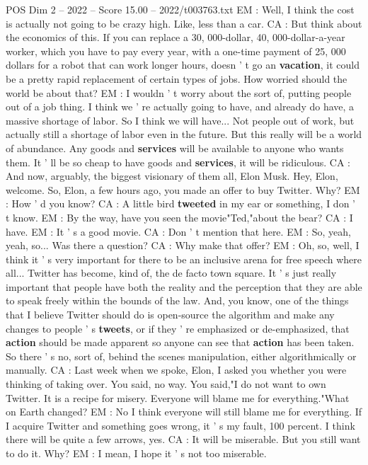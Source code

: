 \begin{textsample}{POS Dim 2 – 2022 – Score 15.00 – 2022/t003763.txt}
EM : Well, I think the cost is actually not going to be crazy high.
Like, less than a car.
CA : But think about the economics of this.
If you can replace a 30, 000-dollar, 40, 000-dollar-a-year worker, which you have to pay every year, with a one-time payment of 25, 000 dollars for a robot that can work longer hours, doesn ' t go an \textbf{vacation}, it could be a pretty rapid replacement of certain types of jobs.
How worried should the world be about that?
EM : I wouldn ' t worry about the sort of, putting people out of a job thing.
I think we ' re actually going to have, and already do have, a massive shortage of labor.
So I think we will have...
Not people out of work, but actually still a shortage of labor even in the future.
But this really will be a world of abundance.
Any goods and \textbf{services} will be available to anyone who wants them.
It ' ll be so cheap to have goods and \textbf{services}, it will be ridiculous.
CA : And now, arguably, the biggest visionary of them all, Elon Musk.
Hey, Elon, welcome.
So, Elon, a few hours ago, you made an offer to buy Twitter.
Why?
EM : How ' d you know?
CA : A little bird \textbf{tweeted} in my ear or something, I don ' t know.
EM : By the way, have you seen the movie"Ted,"about the bear?
CA : I have.
EM : It ' s a good movie.
CA : Don ' t mention that here.
EM : So, yeah, yeah, so...
Was there a question?
CA : Why make that offer?
EM : Oh, so, well, I think it ' s very important for there to be an inclusive arena for free speech where all...
Twitter has become, kind of, the de facto town square.
It ' s just really important that people have both the reality and the perception that they are able to speak freely within the bounds of the law.
And, you know, one of the things that I believe Twitter should do is open-source the algorithm and make any changes to people ' s \textbf{tweets}, or if they ' re emphasized or de-emphasized, that \textbf{action} should be made apparent so anyone can see that \textbf{action} has been taken.
So there ' s no, sort of, behind the scenes manipulation, either algorithmically or manually.
CA : Last week when we spoke, Elon, I asked you whether you were thinking of taking over.
You said, no way.
You said,"I do not want to own Twitter.
It is a recipe for misery.
Everyone will blame me for everything."What on Earth changed?
EM : No I think everyone will still blame me for everything.
If I acquire Twitter and something goes wrong, it ' s my fault, 100 percent.
I think there will be quite a few arrows, yes.
CA : It will be miserable.
But you still want to do it.
Why?
EM : I mean, I hope it ' s not too miserable.

\end{textsample}
